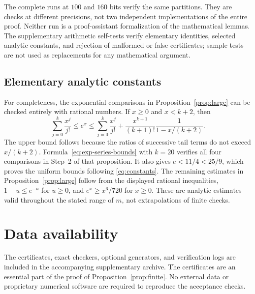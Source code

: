 \documentclass[11pt,reqno]{amsart}
\theoremstyle{definition}
\theoremstyle{remark}
\numberwithin{equation}{section}
\begin{document}
The complete runs at $100$ and $160$ bits verify the same partitions. They are checks at different precisions, not two independent implementations of the entire proof. Neither run is a proof-assistant formalization of the mathematical lemmas. The supplementary arithmetic self-tests verify elementary identities, selected analytic constants, and rejection of malformed or false certificates; sample tests are not used as replacements for any mathematical argument.

\subsection{Elementary analytic constants}

For completeness, the exponential comparisons in Proposition~\ref{prop:large} can be checked entirely with rational numbers. If $x\ge0$ and $x<k+2$, then
\begin{equation}\label{eq:exp-series-bounds}
 \sum_{j=0}^k\frac{x^j}{j!}
 \le e^x\le
 \sum_{j=0}^k\frac{x^j}{j!}
 +\frac{x^{k+1}}{(k+1)!}\frac1{1-x/(k+2)}.
\end{equation}
The upper bound follows because the ratios of successive tail terms do not exceed $x/(k+2)$. Formula~\eqref{eq:exp-series-bounds} with $k=20$ verifies all four comparisons in Step~2 of that proposition. It also gives $e<11/4<25/9$, which proves the uniform bounds following \eqref{eq:constants}. The remaining estimates in Proposition~\ref{prop:large} follow from the displayed rational inequalities, $1-u\le e^{-u}$ for $u\ge0$, and $e^x\ge x^6/720$ for $x\ge0$. These are analytic estimates valid throughout the stated range of $m$, not extrapolations of finite checks.

\section*{Data availability}
The certificates, exact checkers, optional generators, and verification logs are included in the accompanying supplementary archive. The certificates are an essential part of the proof of Proposition~\ref{prop:finite}. No external data or proprietary numerical software are required to reproduce the acceptance checks.
\end{document}
